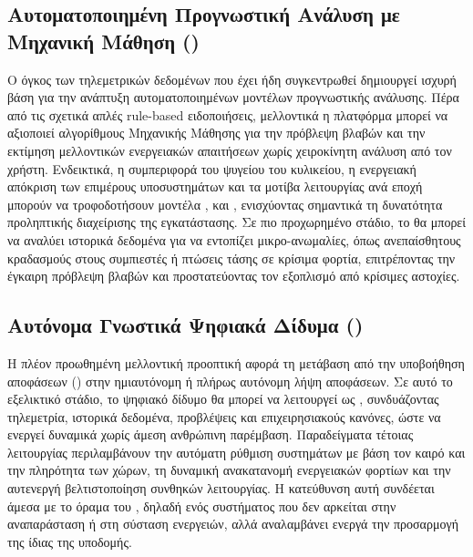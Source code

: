 \subsection{Αυτοματοποιημένη Προγνωστική Ανάλυση με Μηχανική Μάθηση ()}
Ο όγκος των τηλεμετρικών δεδομένων που έχει ήδη συγκεντρωθεί δημιουργεί ισχυρή βάση για την ανάπτυξη αυτοματοποιημένων μοντέλων προγνωστικής ανάλυσης. Πέρα από τις σχετικά απλές rule-based ειδοποιήσεις, μελλοντικά η πλατφόρμα μπορεί να αξιοποιεί αλγορίθμους Μηχανικής Μάθησης για την πρόβλεψη βλαβών και την εκτίμηση μελλοντικών ενεργειακών απαιτήσεων χωρίς χειροκίνητη ανάλυση από τον χρήστη. Ενδεικτικά, η συμπεριφορά του ψυγείου του κυλικείου, η ενεργειακή απόκριση των επιμέρους υποσυστημάτων και τα μοτίβα λειτουργίας ανά εποχή μπορούν να τροφοδοτήσουν μοντέλα ,  και , ενισχύοντας σημαντικά τη δυνατότητα προληπτικής διαχείρισης της εγκατάστασης. Σε πιο προχωρημένο στάδιο, το  θα μπορεί να αναλύει ιστορικά δεδομένα για να εντοπίζει μικρο-ανωμαλίες, όπως ανεπαίσθητους κραδασμούς στους συμπιεστές ή πτώσεις τάσης σε κρίσιμα φορτία, επιτρέποντας την έγκαιρη πρόβλεψη βλαβών και προστατεύοντας τον εξοπλισμό από κρίσιμες αστοχίες.

\subsection{Αυτόνομα Γνωστικά Ψηφιακά Δίδυμα ()}
Η πλέον προωθημένη μελλοντική προοπτική αφορά τη μετάβαση από την υποβοήθηση αποφάσεων () στην ημιαυτόνομη ή πλήρως αυτόνομη λήψη αποφάσεων. Σε αυτό το εξελικτικό στάδιο, το ψηφιακό δίδυμο θα μπορεί να λειτουργεί ως , συνδυάζοντας τηλεμετρία, ιστορικά δεδομένα, προβλέψεις και επιχειρησιακούς κανόνες, ώστε να ενεργεί δυναμικά χωρίς άμεση ανθρώπινη παρέμβαση. Παραδείγματα τέτοιας λειτουργίας περιλαμβάνουν την αυτόματη ρύθμιση συστημάτων  με βάση τον καιρό και την πληρότητα των χώρων, τη δυναμική ανακατανομή ενεργειακών φορτίων και την αυτενεργή βελτιστοποίηση συνθηκών λειτουργίας. Η κατεύθυνση αυτή συνδέεται άμεσα με το όραμα του , δηλαδή ενός συστήματος που δεν αρκείται στην αναπαράσταση ή στη σύσταση ενεργειών, αλλά αναλαμβάνει ενεργά την προσαρμογή της ίδιας της υποδομής.

